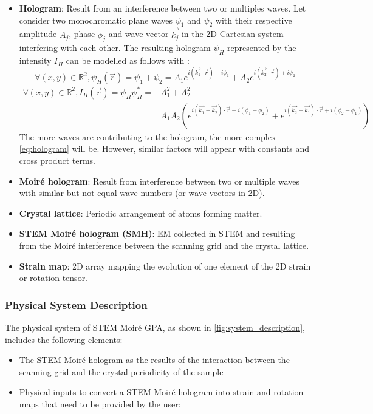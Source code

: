 \documentclass[12pt]{article}
\newcommand{\progname}{STEM Moir{\'e} GPA}
\begin{document}
\begin{itemize}
\begin{figure}[H]
\end{figure}
\item \textbf{Hologram}: Result from an interference between two or multiples waves. \newline
Let consider two monochromatic plane waves $\psi_1$ and $\psi_2$ with their respective amplitude $A_j$, phase $\phi_j$ and wave vector $\vec{k_j}$ in the 2D Cartesian system interfering with each other. The resulting hologram $\psi_H$ represented by the intensity $I_H$ can be modelled as follows with :
\begin{equation}
\forall (x,y) \in \mathbb{R}^{2}, \psi_H(\vec{r})=\psi_1+\psi_2= A_1e^{i(\vec{k_1}\cdot\vec{r})+i\phi_1}+A_2e^{i(\vec{k_2}\cdot\vec{r})+i\phi_2}
\end{equation}
\begin{equation}
\begin{split}
\forall (x,y) \in \mathbb{R}^{2}, I_H(\vec{r})=\psi_H\psi_H^{*}= & A_{1}^{2}+A_{2}^{2}+ \\ & A_{1}A_{2}(e^{i(\vec{k_1}-\vec{k_2})\cdot\vec{r}+i(\phi_1-\phi_2)}+e^{i(\vec{k_2}-\vec{k_1})\cdot\vec{r}+i(\phi_2-\phi_1)})
\end{split}
\label{eq:hologram}
\end{equation}
The more waves are contributing to the hologram, the more complex \cref{eq:hologram} will be. However, similar factors will appear with constants and cross product terms.
\item \textbf{Moir{\'e} hologram}: Result from interference between two or multiple waves with similar but not equal wave numbers (or wave vectors in 2D).
\item \textbf{Crystal lattice}: Periodic arrangement of atoms forming matter.
\item \textbf{STEM Moir{\'e} hologram (SMH)}: EM collected in STEM and resulting from the 
Moir{\'e} interference between the scanning grid and the crystal lattice. 
\item \textbf{Strain map}: 2D array mapping the evolution of one element of the 2D strain or rotation 
tensor. 
\end{itemize}

\subsubsection{Physical System Description}

The physical system of \progname{}, as shown in \cref{fig:system_description}, includes the following elements:
\begin{itemize}
\item The STEM Moir{\'e} hologram as the results of the interaction between the scanning grid and the crystal periodicity of the sample
\item Physical inputs to convert a STEM Moir{\'e} hologram into strain and rotation maps that need to be provided by the user: 
\end{itemize}
\end{document}
